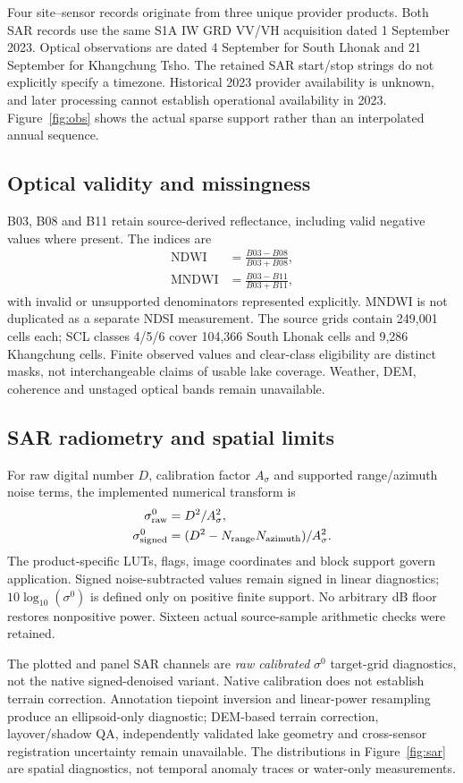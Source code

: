 \documentclass[10pt,twocolumn]{article}
\begin{document}
Four site--sensor records originate from three unique provider products. Both SAR records use the same S1A IW GRD VV/VH acquisition dated 1 September 2023. Optical observations are dated 4 September for South Lhonak and 21 September for Khangchung Tsho. The retained SAR start/stop strings do not explicitly specify a timezone. Historical 2023 provider availability is unknown, and later processing cannot establish operational availability in 2023. Figure~\ref{fig:obs} shows the actual sparse support rather than an interpolated annual sequence.

\subsection{Optical validity and missingness}
B03, B08 and B11 retain source-derived reflectance, including valid negative values where present. The indices are
\begin{align}
\mathrm{NDWI}&=\frac{B03-B08}{B03+B08},\\
\mathrm{MNDWI}&=\frac{B03-B11}{B03+B11},
\end{align}
with invalid or unsupported denominators represented explicitly. MNDWI is not duplicated as a separate NDSI measurement. The source grids contain 249,001 cells each; SCL classes 4/5/6 cover 104,366 South Lhonak cells and 9,286 Khangchung cells. Finite observed values and clear-class eligibility are distinct masks, not interchangeable claims of usable lake coverage. Weather, DEM, coherence and unstaged optical bands remain unavailable.

\subsection{SAR radiometry and spatial limits}
For raw digital number $D$, calibration factor $A_\sigma$ and supported range/azimuth noise terms, the implemented numerical transform is
\begin{align}
\sigma^0_{\rm raw}&=D^2/A_\sigma^2,\\
\sigma^0_{\rm signed}&=(D^2-N_{\rm range}N_{\rm azimuth})/A_\sigma^2.
\end{align}
The product-specific LUTs, flags, image coordinates and block support govern application. Signed noise-subtracted values remain signed in linear diagnostics; $10\log_{10}(\sigma^0)$ is defined only on positive finite support. No arbitrary dB floor restores nonpositive power. Sixteen actual source-sample arithmetic checks were retained.

The plotted and panel SAR channels are \emph{raw calibrated} $\sigma^0$ target-grid diagnostics, not the native signed-denoised variant. Native calibration does not establish terrain correction. Annotation tiepoint inversion and linear-power resampling produce an ellipsoid-only diagnostic; DEM-based terrain correction, layover/shadow QA, independently validated lake geometry and cross-sensor registration uncertainty remain unavailable. The distributions in Figure~\ref{fig:sar} are spatial diagnostics, not temporal anomaly traces or water-only measurements.
\end{document}
